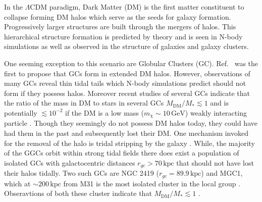 \documentclass[aps,floatfix,prd,showpacs]{revtex4}
\newcommand{\mx}{m_\chi}
\newcommand{\MDM}{M_{\mathrm{DM}}}
\newcommand{\kpc}{\textrm{kpc}}
\newcommand{\gev}{\textrm{GeV}}
\begin{document}
In the $\Lambda$CDM paradigm, Dark Matter (DM) is the first matter constituent to collapse forming DM halos which serve as the seeds for galaxy formation.  Progressively larger structures are built through the mergers of halos.  This hierarchical structure formation is predicted by theory and is seen in N-body simulations as well as observed in the structure of galaxies and galaxy clusters.  


One seeming exception to this scenario are Globular Clusters (GC).  Ref.~\cite{Peebles1984} was the first to propose that GCs form in extended DM halos.  However, observations of many GCs reveal thin tidal tails which N-body simulations predict should not form if they possess halos.  Moreover recent studies of several GCs indicate that the ratio of the mass in DM to stars in several GCs $\MDM/M_* \lesssim 1$ \cite{Grillmair1995,Odenkirchen2003,Moore1996,Shin, Conroy} and is potentially $\lesssim 10^{-2}$ if the DM is a low mass ($\mx \sim 10\, \gev$) weakly interacting particle \cite{Hurst}.  Though they seemingly do not possess DM halos today, they could have had them in the past and subsequently lost their DM.  One mechanism invoked for the removal of the halo is tridal stripping by the galaxy \cite{Bromm2002,Mashchenko2005}.  While, the majority of the GGCs orbit within strong tidal fields there does exist a population of isolated GCs with galactocentric distances $r_{gc} > 70\, \kpc$ that should not have lost their halos tidally.  Two such GCs are NGC 2419 ($r_{gc} = 89.9\, \kpc$) and MGC1, which at $\sim 200\, \kpc$ from M31 is the most isolated cluster in the local group \cite {Harris, Conroy}.  Obseravtions of both these cluster indicate that $\MDM/M_* \lesssim 1$ \cite{Conroy}.


\end{document}
